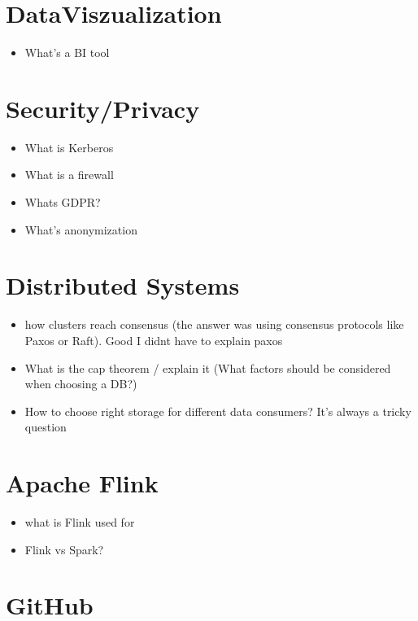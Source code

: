\documentclass[12pt, numbers=noenddot]{scrreprt} %
\begin{document}
\section*{DataViszualization}

\begin{itemize}
\item What's a BI tool
\end{itemize}

\section*{Security/Privacy}

\begin{itemize}
\item What is Kerberos
\item What is a firewall
\item Whats GDPR?
\item What's anonymization
\end{itemize}

\section*{Distributed Systems}

\begin{itemize}
\item how clusters reach consensus (the answer was using consensus protocols like Paxos or Raft). Good I didnt have to explain paxos
\item What is the cap theorem / explain it (What factors should be considered when choosing a DB?)
\item How to choose right storage for different data consumers? It’s always a tricky question
\end{itemize}

\section*{Apache Flink}

\begin{itemize}
\item what is Flink used for
\item Flink vs Spark?
\end{itemize}

\section*{GitHub}
\end{document}
